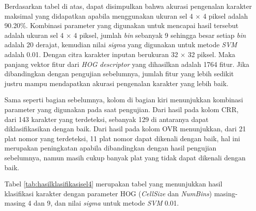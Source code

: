 \noindent Berdasarkan tabel di atas, dapat disimpulkan bahwa akurasi pengenalan karakter maksimal yang didapatkan apabila menggunakan ukuran sel 4 $\times$ 4 piksel adalah 90.20\%. Kombinasi parameter yang digunakan untuk mencapai hasil tersebut adalah ukuran sel 4 $\times$ 4 piksel, jumlah \textit{bin} sebanyak 9 sehingga besar setiap \textit{bin} adalah 20 derajat, kemudian nilai \textit{sigma} yang digunakan untuk metode \textit{SVM} adalah 0.01. Dengan citra karakter inputan berukuran 32 $\times$ 32 piksel. Maka panjang vektor fitur dari \textit{HOG descriptor} yang dihasilkan adalah 1764 fitur. Jika dibandingkan dengan pengujian sebelumnya, jumlah fitur yang lebih sedikit justru mampu mendapatkan akurasi pengenalan karakter yang lebih baik.

\noindent Sama seperti bagian sebelumnya, kolom di bagian kiri menunjukkan kombinasi parameter yang digunakan pada saat pengujian. Dari hasil pada kolom CRR, dari 143 karakter yang terdeteksi, sebanyak 129 di antaranya dapat diklasifikasikan dengan baik. Dari hasil pada kolom OVR menunjukkan, dari 21 plat nomor yang terdeteksi, 11 plat nomor dapat dikenali dengan baik, hal ini merupakan peningkatan apabila dibandingkan dengan hasil pengujian sebelumnya, namun masih cukup banyak plat yang tidak dapat dikenali dengan baik. 

\noindent Tabel \ref{tab:hasilklasifikasisel4} merupakan tabel yang menunjukkan hasil klasifikasi karakter dengan parameter HOG (\textit{CellSize} dan \textit{NumBins}) masing-masing 4 dan 9, dan nilai \textit{sigma} untuk metode \textit{SVM} 0.01.

